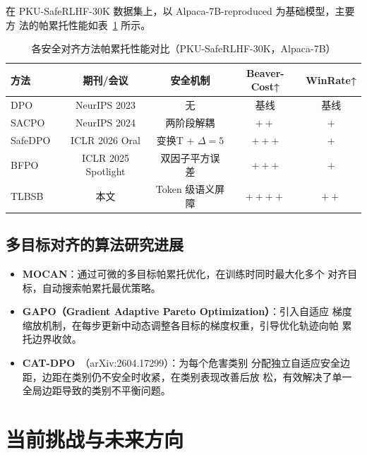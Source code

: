 \documentclass[12pt,a4paper,UTF8]{ctexart}
\begin{document}
在 PKU-SafeRLHF-30K 数据集上，以 Alpaca-7B-reproduced 为基础模型，主要方
法的帕累托性能如表~\ref{tab:pareto} 所示。

\begin{table}[H]
  \centering
  \caption{各安全对齐方法帕累托性能对比（PKU-SafeRLHF-30K，Alpaca-7B）}
  \label{tab:pareto}
  \small
  \begin{tabular}{lcccc}
    \toprule
    \textbf{方法} & \textbf{期刊/会议} & \textbf{安全机制} &
      \textbf{Beaver-Cost↑} & \textbf{WinRate↑} \\
    \midrule
    DPO~\cite{rafailov2023dpo} & NeurIPS 2023 & 无 & 基线 & 基线 \\
    SACPO~\cite{sacpo2024} & NeurIPS 2024 & 两阶段解耦 & $++$ & $+$ \\
    SafeDPO~\cite{safedpo2026} & ICLR 2026 Oral & 变换T + $\Delta=5$ & $+++$ & $+$ \\
    BFPO~\cite{bfpo2025} & ICLR 2025 Spotlight & 双因子平方误差 & $+++$ & $+$ \\
    TLBSB & 本文 & Token 级语义屏障 & $++++$ & $++$ \\
    \bottomrule
  \end{tabular}
\end{table}

\subsection{多目标对齐的算法研究进展}

\begin{itemize}[leftmargin=2em]
  \item \textbf{MOCAN}：通过可微的多目标帕累托优化，在训练时同时最大化多个
    对齐目标，自动搜索帕累托最优策略。
  \item \textbf{GAPO（Gradient Adaptive Pareto Optimization）}：引入自适应
    梯度缩放机制，在每步更新中动态调整各目标的梯度权重，引导优化轨迹向帕
    累托边界收敛。
  \item \textbf{CAT-DPO}~\cite{catdpo2026}（arXiv:2604.17299）：为每个危害类别
    分配独立自适应安全边距，边距在类别仍不安全时收紧，在类别表现改善后放
    松，有效解决了单一全局边距导致的类别不平衡问题。
\end{itemize}

\section{当前挑战与未来方向}
\label{sec:future}
\end{document}
